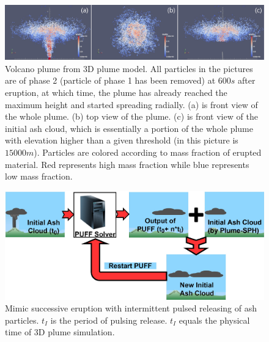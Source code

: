 \documentclass[utf8]{frontiersSCNS} %
\begin{document}
\begin{figure}[!htb]
\centering
\includegraphics[width=1.0\textwidth]{Figures/Plume-SPH-Results}
\caption{Volcano plume from 3D plume model. All particles in the pictures are of  phase 2 (particle of phase 1 has been removed) at $600s$ after eruption, at which time, the plume has already reached the maximum height and started spreading radially. (a) is front view of the whole plume. (b) top view of the plume. (c) is front view of the initial ash cloud, which is essentially a portion of the whole plume with elevation higher than a given threshold (in this picture is $15000 m$). Particles are colored according to mass fraction of erupted material. Red represents high mass fraction while blue represents low mass fraction.}
\label{fig:Plume-SPH-Pinatubo-ash-cloud}
\end{figure}

\begin{figure}
\center
\includegraphics[width=0.90 \textwidth]{Figures/Restart-Puff}
\caption{Mimic successive eruption with intermittent pulsed releasing of ash particles. $t_I$ is the period of pulsing release. $t_I$ equals the physical time of 3D plume simulation.}
\label{fig:Restart-Puff}
\end{figure}
\end{document}
